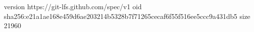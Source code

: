 version https://git-lfs.github.com/spec/v1
oid sha256:e21a1ae168e459d6ae203214b5328b7f71265cecaf6f55f516ee5ccc9a431db5
size 21960
